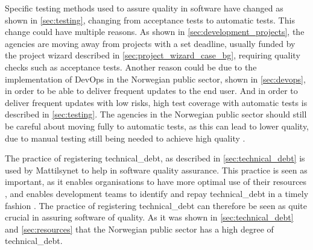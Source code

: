 Specific testing methods used to assure quality in software have changed as shown in \autoref{sec:testing}, changing from acceptance tests to automatic tests. This change could have multiple reasons. As shown in \autoref{sec:development_projects}, the agencies are moving away from projects with a set deadline, usually funded by the project wizard described in \autoref{sec:project_wizard_case_bg}, requiring quality checks such as acceptance tests. Another reason could be due to the implementation of DevOps in the Norwegian public sector, shown in \autoref{sec:devops}, in order to be able to deliver frequent updates to the end user. And in order to deliver frequent updates with low risks, high test coverage with automatic tests is described in \autoref{sec:testing}. The agencies in the Norwegian public sector should still be careful about moving fully to automatic tests, as this can lead to lower quality, due to manual testing still being needed to achieve high quality \cite{dsc_2019}. 


The practice of registering \gls{technical_debt}, as described in \autoref{sec:technical_debt} is used by Mattilsynet to help in software quality assurance. This practice is seen as important, as it enables organisations to have more optimal use of their resources \cite{mv_2022}, and enables development teams to identify and repay \gls{technical_debt} in a timely fashion \cite{mv_2022}. The practice of registering \gls{technical_debt} can therefore be seen as quite crucial in assuring software of quality. As it was shown in \autoref{sec:technical_debt} and \autoref{sec:resources} that the Norwegian public sector has a high degree of \gls{technical_debt}.

